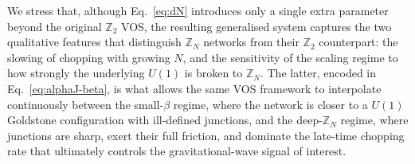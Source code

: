 We stress that, although Eq.~\eqref{eq:dN} introduces only a single
extra parameter beyond the original $\mathbb{Z}_2$ VOS, the resulting
generalised system captures the two qualitative features that
distinguish $\mathbb{Z}_N$ networks from their $\mathbb{Z}_2$
counterpart: the slowing of chopping with growing $N$, and the
sensitivity of the scaling regime to how strongly the underlying
$U(1)$ is broken to $\mathbb{Z}_N$. The latter, encoded in
Eq.~\eqref{eq:alphaJ-beta}, is what allows the same VOS framework to
interpolate continuously between the small-$\beta$ regime, where the
network is closer to a $U(1)$ Goldstone configuration with
ill-defined junctions, and the deep-$\mathbb{Z}_N$ regime, where
junctions are sharp, exert their full friction, and dominate the
late-time chopping rate that ultimately controls the
gravitational-wave signal of interest.
